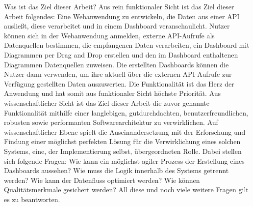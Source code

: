 Was ist das Ziel dieser Arbeit? Aus rein funktionaler Sicht ist das Ziel dieser Arbeit
folgendes: Eine Webanwendung zu entwickeln, die Daten aus einer API ausließt,
diese verarbeitet und in einem Dashboard veranschaulicht. Nutzer können sich
in der Webanwendung anmelden, externe API-Aufrufe als Datenquellen bestimmen,
die empfangenen Daten verarbeiten, ein Dashboard mit Diagrammen per Drag and Drop erstellen
und den im Dashboard enthaltenen Diagrammen Datenquellen zuweisen. Die erstellten
Dashboards können die Nutzer dann verwenden, um ihre aktuell über die externen 
API-Aufrufe zur Verfügung gestellten Daten auszuwerten. Die Funktionalität
ist das Herz der Anwendung und hat somit aus funktionaler Sicht höchste Priorität.
Aus wissenschaftlicher Sicht ist das Ziel dieser Arbeit die zuvor genannte
Funktionalität mithilfe einer langlebigen, gutdurchdachten, benutzerfreundlichen,
robusten sowie performanten Softwarearchitektur zu verwirklichen. Auf wissenschaftlicher
Ebene spielt die Auseinandersetzung mit der Erforschung und Findung einer möglichst perfekten
Lösung für die Verwirklichung eines solchen Systems, eine, der Implementierung selbst,
übergeordneten Rolle. Dabei stellen sich folgende Fragen: Wie kann ein möglichst agiler
Prozess der Erstellung eines Dashboards aussehen? Wie muss die Logik innerhalb des Systems
getrennt werden? Wie kann der Datenfluss optimiert werden? Wie können Qualitätsmerkmale
gesichert werden? All diese und noch viele weitere Fragen gilt es zu beantworten.

